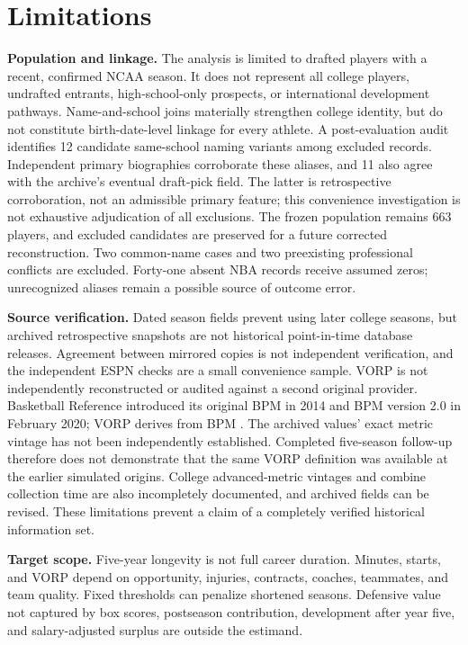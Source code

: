 \documentclass[11pt]{article}
\begin{document}
\section{Limitations}
\textbf{Population and linkage.} The analysis is limited to drafted players with a recent, confirmed NCAA season. It does not represent all college players, undrafted entrants, high-school-only prospects, or international development pathways. Name-and-school joins materially strengthen college identity, but do not constitute birth-date-level linkage for every athlete. A post-evaluation audit identifies 12 candidate same-school naming variants among excluded records. Independent primary biographies corroborate these aliases, and 11 also agree with the archive's eventual draft-pick field. The latter is retrospective corroboration, not an admissible primary feature; this convenience investigation is not exhaustive adjudication of all exclusions. The frozen population remains 663 players, and excluded candidates are preserved for a future corrected reconstruction. Two common-name cases and two preexisting professional conflicts are excluded. Forty-one absent NBA records receive assumed zeros; unrecognized aliases remain a possible source of outcome error.

\textbf{Source verification.} Dated season fields prevent using later college seasons, but archived retrospective snapshots are not historical point-in-time database releases. Agreement between mirrored copies is not independent verification, and the independent ESPN checks are a small convenience sample. VORP is not independently reconstructed or audited against a second original provider. Basketball Reference introduced its original BPM in 2014 and BPM version 2.0 in February 2020; VORP derives from BPM \cite{bref}. The archived values' exact metric vintage has not been independently established. Completed five-season follow-up therefore does not demonstrate that the same VORP definition was available at the earlier simulated origins. College advanced-metric vintages and combine collection time are also incompletely documented, and archived fields can be revised. These limitations prevent a claim of a completely verified historical information set.

\textbf{Target scope.} Five-year longevity is not full career duration. Minutes, starts, and VORP depend on opportunity, injuries, contracts, coaches, teammates, and team quality. Fixed thresholds can penalize shortened seasons. Defensive value not captured by box scores, postseason contribution, development after year five, and salary-adjusted surplus are outside the estimand.
\end{document}

